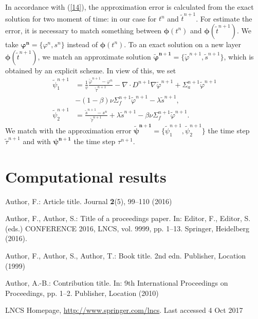 \documentclass[runningheads]{llncs}
\begin{document}
In accordance with (\ref{14}), the approximation error is calculated from the exact solution for two moment of time: in our case for $t^n$ and $\widetilde{t}^{n+1}$.
For estimate the error, it is necessary to match something between $\bm{\phi}(t^n)$ and $\bm{\phi}(\widetilde{t}^{n+1})$.  We take $\bm{\varphi^n} = \{\varphi^n, s^n\}$ instead of $\bm{\phi}(t^n)$. To an exact solution on a new layer $\bm{\phi}(\widetilde{t}^{n+1})$, we match an approximate solution $\bm{\widetilde{\varphi}^{n+1}} = \{\widetilde{\varphi}^{n+1}, \widetilde{s}^{n+1}\}$, which is obtained by an explicit scheme. In view of this, we set
\begin{equation}\label{16}
\begin{split}
\widetilde\psi^{n+1}_1  & =  \frac{1}{v} \frac{\widetilde\varphi^{n+1}-\varphi^n}{\widetilde\tau^{n+1}} - \nabla \cdot D^{n+1} \nabla \widetilde\varphi^{n+1} + \Sigma_{a}^{n+1} \widetilde\varphi^{n+1} \\
&- (1-\beta) \nu \Sigma^{n+1}_{f} \widetilde\varphi^{n+1} - \lambda \widetilde s^{n+1}, \\
\widetilde\psi^{n+1}_2  & =  \frac{\widetilde s^{n+1}-s^n}{\widetilde\tau^{n+1}} + \lambda \widetilde s^{n+1} - \beta \nu\Sigma_{f}^{n+1} \widetilde\varphi^{n+1}.
\end{split}
\end{equation} 
We match with the approximation error $\bm{\widetilde{\psi}^{n+1} }= \{\widetilde{\psi}^{n+1}_1, \widetilde{\psi}^{n+1}_2\}$ the time step $\widetilde{\tau}^{n+1}$ and with $\bm{\psi^{n+1}}$ the time step $\tau^{n+1}$.

\section{Computational results}
				


%
%
% 
% 
%
\begin{thebibliography}{8}
Author, F.: Article title. Journal \textbf{2}(5), 99--110 (2016)

Author, F., Author, S.: Title of a proceedings paper. In: Editor,
F., Editor, S. (eds.) CONFERENCE 2016, LNCS, vol. 9999, pp. 1--13.
Springer, Heidelberg (2016). 

Author, F., Author, S., Author, T.: Book title. 2nd edn. Publisher,
Location (1999)

Author, A.-B.: Contribution title. In: 9th International Proceedings
on Proceedings, pp. 1--2. Publisher, Location (2010)

LNCS Homepage, \url{http://www.springer.com/lncs}. Last accessed 4
Oct 2017
\end{thebibliography}
\end{document}
